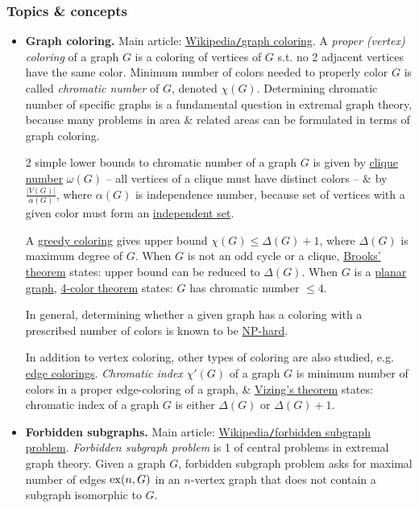 \documentclass{article}
\begin{document}
\subsubsection{Topics \& concepts}

\begin{itemize}
	\item {\bf Graph coloring.} Main article: \href{https://en.wikipedia.org/wiki/Graph_coloring}{Wikipedia{\tt/}graph coloring}. A {\it proper (vertex) coloring} of a graph $G$ is a coloring of vertices of $G$ s.t. no 2 adjacent vertices have the same color. Minimum number of colors needed to properly color $G$ is called {\it chromatic number} of $G$, denoted $\chi(G)$. Determining chromatic number of specific graphs is a fundamental question in extremal graph theory, because many problems in area \& related areas can be formulated in terms of graph coloring.
	
	2 simple lower bounds to chromatic number of a graph $G$ is given by \href{https://en.wikipedia.org/wiki/Clique_number}{clique number} $\omega(G)$ -- all vertices of a clique must have distinct colors -- \& by $\frac{|V(G)|}{\alpha(G)}$, where $\alpha(G)$ is independence number, because set of vertices with a given color must form an \href{https://en.wikipedia.org/wiki/Independent_set_(graph_theory)}{independent set}.
	
	A \href{https://en.wikipedia.org/wiki/Greedy_coloring}{greedy coloring} gives upper bound $\chi(G)\le\Delta(G) + 1$, where $\Delta(G)$ is maximum degree of $G$. When $G$ is not an odd cycle or a clique, \href{https://en.wikipedia.org/wiki/Brooks%27_theorem}{Brooks' theorem} states: upper bound can be reduced to $\Delta(G)$. When $G$ is a \href{https://en.wikipedia.org/wiki/Planar_graph}{planar graph}, \href{https://en.wikipedia.org/wiki/Four-color_theorem}{4-color theorem} states: $G$ has chromatic number $\le4$.
	
	In general, determining whether a given graph has a coloring with a prescribed number of colors is known to be \href{https://en.wikipedia.org/wiki/NP-hard}{NP-hard}.
	
	In addition to vertex coloring, other types of coloring are also studied, e.g. \href{https://en.wikipedia.org/wiki/Edge_coloring}{edge colorings}. {\it Chromatic index} $\chi'(G)$ of a graph $G$ is minimum number of colors in a proper edge-coloring of a graph, \& \href{https://en.wikipedia.org/wiki/Vizing%27s_theorem}{Vizing's theorem} states: chromatic index of a graph $G$ is either $\Delta(G)$ or $\Delta(G) + 1$.
	\item {\bf Forbidden subgraphs.} Main article: \href{https://en.wikipedia.org/wiki/Forbidden_subgraph_problem}{Wikipedia{\tt/}forbidden subgraph problem}. {\it Forbidden subgraph problem} is 1 of central problems in extremal graph theory. Given a graph $G$, forbidden subgraph problem asks for maximal number of edges ${\rm ex}(n,G)$ in an $n$-vertex graph that does not contain a subgraph isomorphic to $G$.
	

\end{itemize}
\end{document}
